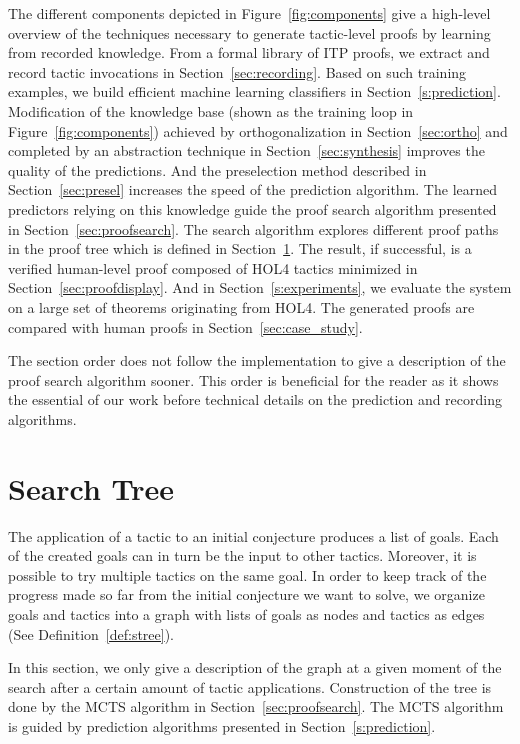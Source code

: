 \documentclass[runningheads,a4paper,draft]{svjour3}
\def\holfour{\textsf{HOL4}\xspace}
\begin{document}
The different components depicted in Figure~\ref{fig:components} give a 
high-level overview of the techniques necessary to generate 
tactic-level proofs by learning from recorded knowledge. From a formal library 
of ITP proofs, we extract and record tactic invocations 
in Section~\ref{sec:recording}. Based on such training examples, we
  build efficient machine learning classifiers in Section~\ref{s:prediction}.
  Modification of the knowledge base (shown as the training loop in 
  Figure~\ref{fig:components})
  achieved by orthogonalization in Section~\ref{sec:ortho} and completed by 
  an abstraction technique in Section~\ref{sec:synthesis}
  improves the quality of the predictions.
  And the preselection method described in Section~\ref{sec:presel} increases 
  the speed of the prediction algorithm.
  The learned predictors relying on this knowledge guide the proof search 
  algorithm presented in Section~\ref{sec:proofsearch}.
  The search algorithm explores different proof paths in the proof tree which 
  is defined in Section~\ref{sec:prelim}. 
  The result, if
  successful, is a verified human-level proof composed of \holfour
  tactics minimized in Section~\ref{sec:proofdisplay}. And in 
  Section~\ref{s:experiments}, we evaluate the system 
  on a large set of theorems originating from \holfour.
  The generated proofs are compared with human proofs in 
  Section~\ref{sec:case_study}.

The section order does not follow the implementation to give a description of 
the proof search algorithm sooner. This order is 
beneficial for the reader as it shows the essential of our work before 
technical details on the prediction and recording algorithms. 


\section{Search Tree}\label{sec:prelim}
The application of a tactic to an initial conjecture produces a list of goals.
Each of the created goals can in turn be the input to other tactics.
Moreover, it is possible to try multiple tactics on the same goal.
In order to keep track of the progress made so far from the initial conjecture
we want to solve, we organize goals and tactics into a graph with lists of goals
as nodes and tactics as edges (See Definition~\ref{def:stree}).

In this section, we only give a description of the graph at a given
moment of the search after a certain amount of tactic applications.
Construction of the tree is done by the MCTS algorithm in
Section~\ref{sec:proofsearch}. The MCTS algorithm is guided by prediction 
algorithms presented in Section~\ref{s:prediction}.
\end{document}
